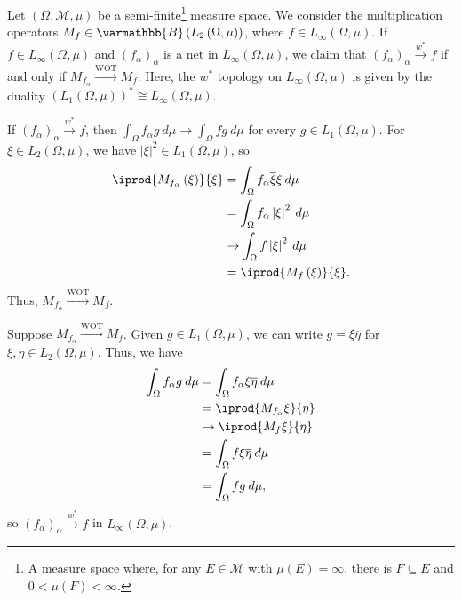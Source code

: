 \documentclass[10pt]{mypackage}
\renewcommand*{\mathbb}[1]{\varmathbb{#1}}
\newcommand{\B}{\mathbb{B}}
\begin{document}
\begin{example}
  Let $\left(\Omega,\mathcal{M},\mu\right)$ be a semi-finite\footnote{A measure space where, for any $E\in \mathcal{M}$ with $\mu(E) = \infty$, there is $F\subseteq E$ and $0 < \mu(F) < \infty$.} measure space. We consider the multiplication operators $M_{f}\in \B\left(L_{2}\left(\Omega,\mu\right)\right)$, where $f\in L_{\infty}\left(\Omega,\mu\right)$. If $f\in L_{\infty}\left(\Omega,\mu\right)$ and $\left(f_{\alpha}\right)_{\alpha}$ is a net in $L_{\infty}\left(\Omega,\mu\right)$, we claim that $\left(f_{\alpha}\right)_{\alpha}\xrightarrow{w^{\ast}}f$ if and only if $M_{f_{\alpha}}\xrightarrow{\text{WOT}}M_{f}$. Here, the $w^{\ast}$ topology on $L_{\infty}\left(\Omega,\mu\right)$ is given by the duality $\left(L_{1}\left(\Omega,\mu\right)\right)^{\ast}\cong L_{\infty}\left(\Omega,\mu\right)$.\newline

  If $\left(f_{\alpha}\right)_{\alpha}\xrightarrow{w^{\ast}}f$, then $\int_{\Omega}^{} f_{\alpha}g\:d\mu\rightarrow \int_{\Omega}^{} fg\:d\mu$ for every $g\in L_{1}\left(\Omega,\mu\right)$. For $\xi\in L_{2}\left(\Omega,\mu\right)$, we have $\left\vert \xi \right\vert^2\in L_{1}\left(\Omega,\mu\right)$, so
  \begin{align*}
    \iprod{M_{f_{\alpha}}\left(\xi\right)}{\xi} &= \int_{\Omega}^{} f_{\alpha}\overline{\xi}\xi\:d\mu\\
                                                &= \int_{\Omega}^{} f_{\alpha}\left\vert \xi \right\vert^2\:d\mu\\
                                                &\rightarrow \int_{\Omega}^{} f\left\vert \xi \right\vert^2\:d\mu\\
                                                &= \iprod{M_{f}\left(\xi\right)}{\xi}.
  \end{align*}
  Thus, $M_{f_{\alpha}}\xrightarrow{\text{WOT}} M_{f}$.\newline

  Suppose $M_{f_{\alpha}}\xrightarrow{\text{WOT}}M_{f}$. Given $g\in L_{1}\left(\Omega,\mu\right)$, we can write $g = \xi \overline{\eta}$ for $\xi,\eta \in L_{2}\left(\Omega,\mu\right)$. Thus, we have
  \begin{align*}
    \int_{\Omega}^{} f_{\alpha}g\:d\mu &= \int_{\Omega}^{} f_{\alpha}\xi \overline{\eta}\:d\mu\\
                                       &= \iprod{M_{f_{\alpha}}\xi}{\eta}\\
                                       &\rightarrow \iprod{M_{f}\xi}{\eta}\\
                                       &= \int_{\Omega}^{} f \xi \overline{\eta}\:d\mu\\
                                       &= \int_{\Omega}^{} fg\:d\mu,
  \end{align*}
  so $\left(f_{\alpha}\right)_{\alpha}\xrightarrow{w^{\ast}}f$ in $L_{\infty}\left(\Omega,\mu\right)$.\newline


\end{example}
\end{document}
